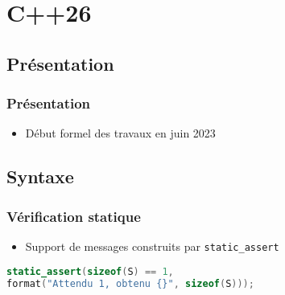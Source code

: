 \documentclass[C++.tex]{subfiles}
\begin{document}
\section{C++26}
\subsection*{Présentation}
\begin{frame}
	\frametitle{Présentation}
	\begin{itemize}
		\item Début formel des travaux en juin 2023
	\end{itemize}
\end{frame}

\subsection*{Syntaxe}
\begin{frame}[fragile]
	\frametitle{Vérification statique}
	\begin{itemize}
		\item Support de messages construits par \lstinline|static_assert|
	\end{itemize}

	\begin{lstlisting}[language=C++]
static_assert(sizeof(S) == 1,
format("Attendu 1, obtenu {}", sizeof(S)));\end{lstlisting}
\end{frame}
\end{document}
